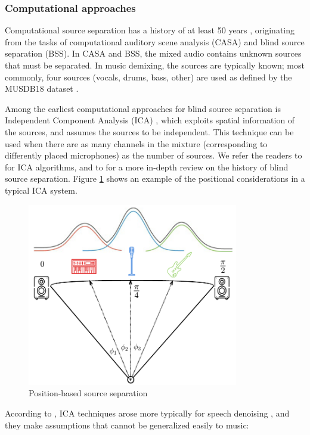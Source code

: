\documentclass[report.tex]{subfiles}
\begin{document}
\subsubsection{Computational approaches}

Computational source separation has a history of at least 50 years \parencite{musicmask, musicsepintro1}, originating from the tasks of computational auditory scene analysis (CASA) and blind source separation (BSS). In CASA and BSS, the mixed audio contains unknown sources that must be separated. In music demixing, the sources are typically known; most commonly, four sources (vocals, drums, bass, other) are used as defined by the MUSDB18 dataset \parencite{musdb18}.

Among the earliest computational approaches for blind source separation is Independent Component Analysis (ICA)  \parencite{musicmask, musicsepgood, musicsepintro1}, which exploits spatial information of the sources, and assumes the sources to be independent. This technique can be used when there are as many channels in the mixture (corresponding to differently placed microphones) as the number of sources. We refer the readers to \textcite{ica1, ica2} for ICA algorithms, and to \textcite{blind1, blind2} for a more in-depth review on the history of blind source separation. Figure \ref{fig:icaposition} shows an example of the positional considerations in a typical ICA system.

\begin{figure}[ht]
	\centering
	\includegraphics[height=8cm]{./images-mss/positional.png}
	\caption{Position-based source separation \parencite[35]{musicsepgood}}
\label{fig:icaposition}
\end{figure}

According to \citeauthor{musicsepintro1}, ICA techniques arose more typically for speech denoising \parencite{speechsep}, and they make assumptions that cannot be generalized easily to music:
\end{document}
